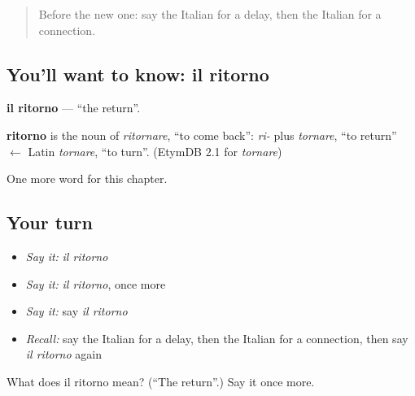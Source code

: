 \label{lesson:IT-C258-ritorno}



\begin{quote}
Before the new one: say the Italian for a delay, then the Italian for a connection.
\end{quote}

\subsection*{You'll want to know: il ritorno}
\textbf{il ritorno} — \textquotedblleft{}the return\textquotedblright{}.

\begin{cousinweb}
\textbf{ritorno} is the noun of \emph{ritornare}, \textquotedblleft{}to come back\textquotedblright{}: \emph{ri-} plus \emph{tornare}, \textquotedblleft{}to return\textquotedblright{} $\leftarrow$ Latin \emph{tornare}, \textquotedblleft{}to turn\textquotedblright{}. (EtymDB 2.1 for \emph{tornare})
\end{cousinweb}

\begin{grammarlens}[title={What you've built}]
One more word for this chapter.
\end{grammarlens}

\subsection*{Your turn}
\begin{itemize}
\raggedright
  \item \emph{Say it:} \emph{il ritorno}
  \item \emph{Say it:} \emph{il ritorno}, once more
  \item \emph{Say it:} say \emph{il ritorno}
  \item \emph{Recall:} say the Italian for a delay, then the Italian for a connection, then say \emph{il ritorno} again
\end{itemize}

\begin{tcolorbox}[breakable,colback=teal!4,colframe=teal!35!black,title={Before you move on}]
What does il ritorno mean? (\textquotedblleft{}The return\textquotedblright{}.) Say it once more.
\end{tcolorbox}
